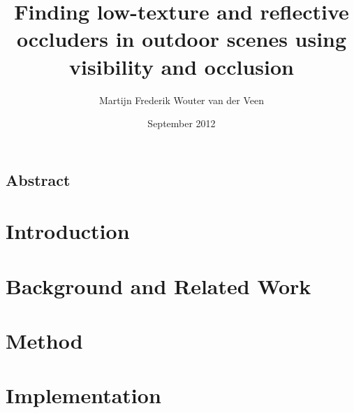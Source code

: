 \documentclass{ucl_thesis}
\title{Finding low-texture and reflective occluders in outdoor scenes
       using visibility and occlusion}
\author{Martijn Frederik Wouter van der Veen}
\date{September 2012}
\begin{document}

\maketitle
{}
\setcounter{page}{1}
\pagestyle{plain}




\newpage
\section*{Abstract}
%



\setcounter{tocdepth}{1}
\tableofcontents
\listoffigures
\listofalgorithms
\newpage

%

\setcounter{page}{1}
\pagestyle{plain}




\chapter{Introduction}
\label{introduction}




\chapter{Background and Related Work}
\label{background}




\chapter{Method} %
\label{method}



\chapter{Implementation} %
\label{chp:impl}
%
\end{document}
